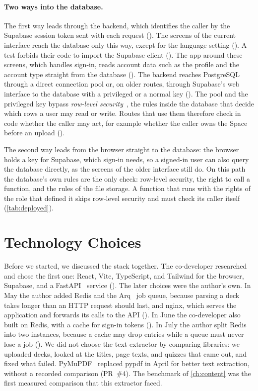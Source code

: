 \paragraph{Two ways into the database.}
The first way leads through the backend, which identifies the caller by the
Supabase session token sent with each request
(). The screens of the current interface reach
the database only this way, except for the language setting
(). A test forbids their code to import
the Supabase client (). The app around these screens,
which handles sign-in, reads account data such as the profile and the
account type straight from the database ().
The backend reaches PostgreSQL through a direct connection pool or, on older
routes, through Supabase's web interface to the database with a privileged
or a normal key (). The pool and
the privileged key bypass \emph{row-level security}~\cite{postgresql-rls},
the rules inside the database that decide which rows a user may read or
write. Routes that use them therefore check in code whether the caller may
act, for example whether the caller owns the Space before an upload
().

The second way leads from the browser straight to the database: the browser
holds a key for Supabase, which sign-in needs, so a signed-in user can also
query the database directly, as the screens of the older interface still do.
On this path the database's own rules are the only check: row-level
security, the right to call a function, and the rules of the file storage.
A function that runs with the rights of the role that defined it skips
row-level security and must check its caller itself (\cref{tab:deployed}).

\section{Technology Choices}
\label{sec:stack}

Before we started, we discussed the stack together. The co-developer
researched and chose the first one: React, Vite, TypeScript, and Tailwind
for the browser, Supabase, and a FastAPI~\cite{fastapi} service
(). The later choices were the author's own. In May the
author added Redis and the Arq~\cite{arq} job queue, because parsing a deck
takes longer than an HTTP request should last, and nginx, which serves the
application and forwards its calls to the API (). In June
the co-developer also built on Redis, with a cache for sign-in tokens
(). In July the author split Redis into two instances,
because a cache may drop entries while a queue must never lose a job
(). We did not choose the text extractor by comparing
libraries: we uploaded decks, looked at the titles, page texts, and quizzes
that came out, and fixed what failed. PyMuPDF~\cite{pymupdf} replaced pypdf
in April for better text extraction, without a recorded comparison
(PR~\#4). The benchmark of \cref{ch:content} was the first measured
comparison that this extractor faced.

